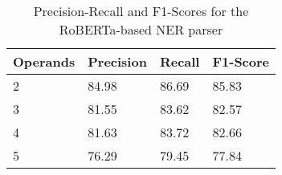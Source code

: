 \begin{table}[t]
\caption{Precision-Recall and F1-Scores for the RoBERTa-based NER parser}
\begin{center}
\begin{tabular}{p{2cm}p{2cm}p{2cm}p{2cm}}
\toprule
\textbf{Operands} & \textbf{Precision} & \textbf{Recall} & \textbf{F1-Score }\\
\toprule
2 & 84.98 & 86.69 & 85.83 \\
3 & 81.55 & 83.62 & 82.57 \\
4 & 81.63 & 83.72 & 82.66 \\
5 & 76.29 & 79.45 & 77.84 \\
\bottomrule
\end{tabular}
\end{center}

\label{tab:parser}
\end{table}